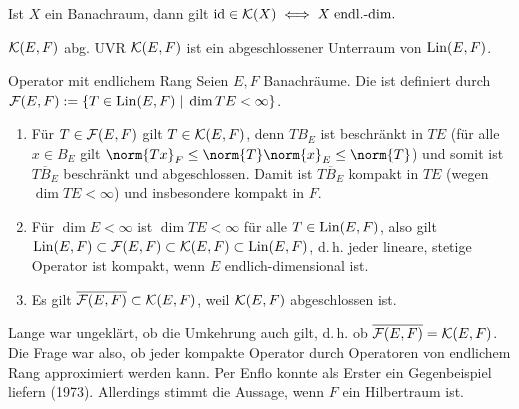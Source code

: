\begin{Bem}
    Ist $X$ ein Banachraum, dann gilt $\text{id} \in \mathcal{K}(X) \iff X \;\text{endl.-dim.}$
\end{Bem}

\begin{Lemma}{$\mathcal{K}(E, F)$ abg. UVR}
    $\mathcal{K}(E, F)$ ist ein abgeschlossener Unterraum von $\operatorname{Lin}(E, F)$.
\end{Lemma}

\linie

\begin{Def}{Operator mit endlichem Rang}
    Seien $E, F$ Banachräume.
    Die  ist definiert durch
    $\mathcal{F}(E, F) := \{T \in \operatorname{Lin}(E, F) \;|\; \dim TE < \infty\}$.
\end{Def}

\begin{Bsp}
    \begin{enumerate}[label=\emph{(\alph*)}]
        \item
        Für $T \in \mathcal{F}(E, F)$ gilt $T \in \mathcal{K}(E, F)$, denn
        $TB_E$ ist beschränkt in $TE$ (für alle $x \in B_E$ gilt
        $\norm{Tx}_F \le \norm{T} \norm{x}_E \le \norm{T}$) und
        somit ist $\overline{TB_E}$ beschränkt und abgeschlossen.
        Damit ist $\overline{TB_E}$ kompakt in $TE$ (wegen $\dim TE < \infty$)
        und insbesondere kompakt in $F$.
        
        \item
        Für $\dim E < \infty$ ist $\dim TE < \infty$ für alle $T \in \operatorname{Lin}(E, F)$,
        also gilt\\
        $\operatorname{Lin}(E, F) \subset \mathcal{F}(E, F) \subset \mathcal{K}(E, F) \subset \operatorname{Lin}(E, F)$,
        d.\,h. jeder lineare, stetige Operator ist kompakt, wenn $E$ endlich-dimensional ist.
        
        \item
        Es gilt $\overline{\mathcal{F}(E, F)} \subset \mathcal{K}(E, F)$, weil $\mathcal{K}(E, F)$ abgeschlossen ist.
    \end{enumerate}
\end{Bsp}

\begin{Bem}
    Lange war ungeklärt, ob die Umkehrung auch gilt,
    d.\,h. ob $\overline{\mathcal{F}(E, F)} = \mathcal{K}(E, F)$.
    Die Frage war also, ob jeder kompakte Operator durch Operatoren von endlichem Rang
    approximiert werden kann.
    Per Enflo konnte als Erster ein Gegenbeispiel liefern (1973).
    Allerdings stimmt die Aussage, wenn $F$ ein Hilbertraum ist.
\end{Bem}

